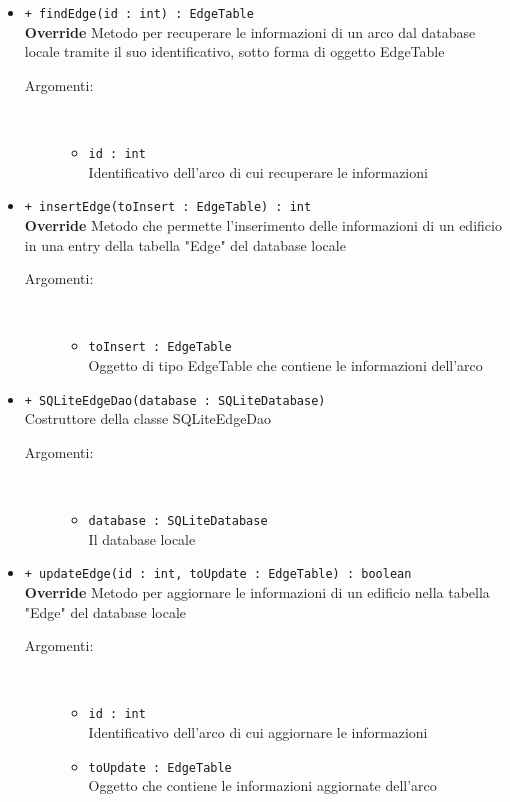 \documentclass[../DefinizioneDiProdotto.tex]{subfiles}
\begin{document}
\begin{description}
\begin{itemize}
\begin{description}
\end{description}
\item \texttt{+ findEdge(id : int) : EdgeTable}\\
\textbf{Override} Metodo per recuperare le informazioni di un arco dal database locale tramite il suo identificativo, sotto forma di oggetto EdgeTable
 \begin{description}
\item[Argomenti:] \
\begin{itemize}
\item \texttt{id : int}\\
Identificativo dell'arco di cui recuperare le informazioni\end{itemize}
\end{description}
\item \texttt{+ insertEdge(toInsert : EdgeTable) : int}\\
\textbf{Override} Metodo che permette l'inserimento delle informazioni di un edificio in una entry della tabella "Edge" del database locale
 \begin{description}
\item[Argomenti:] \
\begin{itemize}
\item \texttt{toInsert : EdgeTable}\\
Oggetto di tipo EdgeTable che contiene le informazioni dell'arco\end{itemize}
\end{description}
\item \texttt{+ SQLiteEdgeDao(database : SQLiteDatabase)}\\
Costruttore della classe SQLiteEdgeDao
 \begin{description}
\item[Argomenti:] \
\begin{itemize}
\item \texttt{database : SQLiteDatabase}\\
Il database locale\end{itemize}
\end{description}
\item \texttt{+ updateEdge(id : int, toUpdate : EdgeTable) : boolean}\\
\textbf{Override} Metodo per aggiornare le informazioni di un edificio nella tabella "Edge" del database locale
 \begin{description}
\item[Argomenti:] \
\begin{itemize}
\item \texttt{id : int}\\
Identificativo dell'arco di cui aggiornare le informazioni\item \texttt{toUpdate : EdgeTable}\\
Oggetto che contiene le informazioni aggiornate dell'arco\end{itemize}
\end{description}
\end{itemize}
\end{description}
\end{document}
